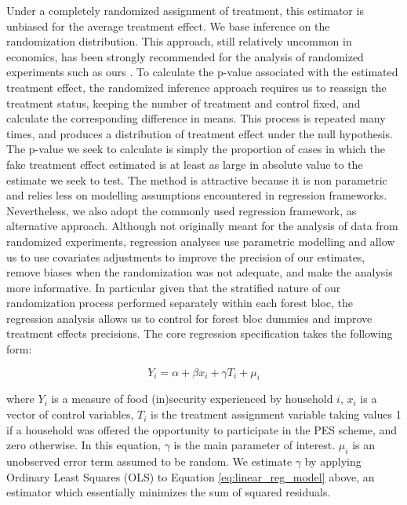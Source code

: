 \documentclass[preprint,12pt]{elsarticle}
\begin{document}
Under a completely randomized assignment of treatment, this estimator is unbiased for the average treatment effect. We base inference on the randomization distribution. This approach, still relatively uncommon in economics, has been strongly recommended for the analysis of randomized experiments such as ours \citet{athey2017econometrics,athey2017state,imbens2009recent}. To calculate the p-value associated with the estimated treatment effect, the randomized inference approach requires us to reassign the treatment status, keeping the number of treatment and control fixed, and calculate the corresponding difference in means. This process is repeated many times, and produces a distribution of treatment effect under the null hypothesis. The p-value we seek to calculate is simply the proportion of cases in which the fake treatment effect estimated is at least as large in absolute value to the estimate we seek to test. The method is attractive because it is non parametric and relies less on modelling assumptions encountered in regression frameworks.  \\ 

Nevertheless, we also adopt the commonly used regression framework, as alternative approach. Although not originally meant for the analysis of data from randomized experiments, regression analyses use parametric modelling and allow us to use covariates adjustments to improve the precision of our estimates, remove biases when the randomization was not adequate, and make the analysis more informative. In particular given that the stratified nature of our randomization process performed separately within each forest bloc, the regression analysis allows us to control for forest bloc dummies and improve treatment effects precisions. The core regression specification takes the following form: 

\begin{equation} \label{eq:linear_reg_model}
Y_{i}=\alpha +\beta x_{i}  + \gamma T_i +\mu_{i}
\end{equation}

where $Y_{i}$ is a measure of food (in)security experienced by household $i$, $x_{i}$ is a vector of control variables, $T_i$ is the treatment assignment variable taking values 1 if a household was offered the opportunity to participate in the PES scheme, and zero otherwise. In this equation, $\gamma$ is the main parameter of interest. $\mu_{i}$ is an unobserved error term assumed to be random. We estimate $\gamma$ by applying Ordinary Least Squares (OLS) to Equation \ref{eq:linear_reg_model} above, an estimator which essentially minimizes the sum of squared residuals.  \\
\end{document}
